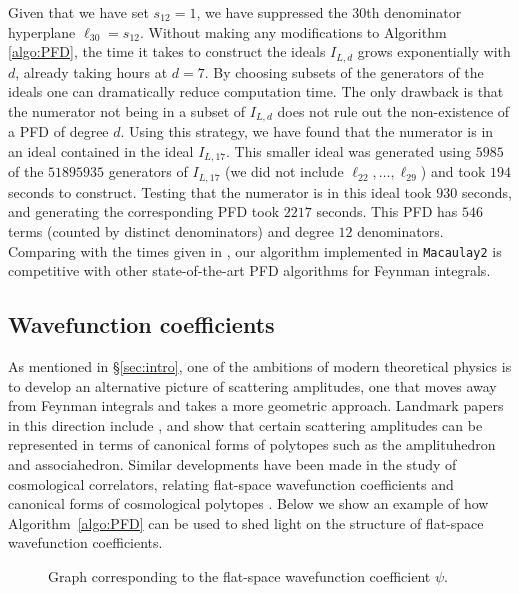 \documentclass [a4paper,reqno, 11pt]{amsart}
\theoremstyle{plain}
\theoremstyle{plain}
\theoremstyle{plain}
\theoremstyle{plain}
\theoremstyle{definition}
\theoremstyle{definition}
\theoremstyle{definition}
\theoremstyle{definition}
\theoremstyle{definition}
\theoremstyle{definition}
\begin{document}
Given that we have set $s_{12}=1$, we have suppressed the $30$th denominator hyperplane $\ell_{30}=s_{12}$. Without making any modifications to Algorithm \ref{algo:PFD}, the time it takes to construct the ideals $I_{L,d}$ grows exponentially with $d$, already taking hours at $d=7$. By choosing subsets of the generators of the ideals one can dramatically reduce computation time. The only drawback is that the numerator not being in a subset of $I_{L,d}$ does not rule out the non-existence of a PFD of degree $d$. Using this strategy, we have found that the numerator is in an ideal contained in the ideal $I_{L,17}$. This smaller ideal was generated using $5985$ of the $51895935$ generators of $I_{L,17}$ (we did not include $\ell_{22},\ldots,\ell_{29}$) and took $194$ seconds to construct. Testing that the numerator is in this ideal took $930$ seconds, and generating the corresponding PFD took $2217$ seconds. This PFD has $546$ terms (counted by distinct denominators) and degree $12$ denominators. Comparing with the times given in \cite[Table 2]{HvM}, our algorithm implemented in \texttt{Macaulay2} is competitive with other state-of-the-art PFD algorithms for Feynman integrals.

\subsection{Wavefunction coefficients}\label{subsec:wavefunc}

As mentioned in \S\ref{sec:intro}, one of the ambitions of modern theoretical physics is to develop an alternative picture of scattering amplitudes, one that moves away from Feynman integrals and takes a more geometric approach. Landmark papers in this direction include \cite{AT}, and show that certain scattering amplitudes can be represented in terms of canonical forms of polytopes such as the amplituhedron and associahedron. Similar developments have been made in the study of cosmological correlators, relating flat-space wavefunction coefficients and canonical forms of cosmological polytopes \cite{ABP}. Below we show an example of how Algorithm~\ref{algo:PFD} can be used to shed light on the structure of flat-space wavefunction coefficients.

\begin{figure}[h]
\centering
{}
\caption{Graph corresponding to the flat-space wavefunction coefficient $\psi$.}
\label{fig: wavefunction}
\end{figure}
\end{document}
